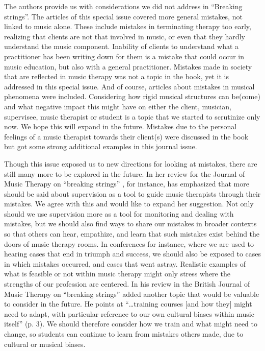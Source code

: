 \documentclass[authordate, empirical, issue]{jote-new-article}
\begin{document}
The authors provide us with considerations we did not address in “Breaking strings”. The articles of this special issue covered more general mistakes, not linked to music alone. These include mistakes in terminating therapy too early, realizing that clients are not that involved in music, or even that they hardly understand the music component. Inability of clients to understand what a practitioner has been writing down for them is a mistake that could occur in music education, but also with a general practitioner. Mistakes made in society that are reflected in music therapy was not a topic in the book, yet it is addressed in this special issue. And of course, articles about mistakes in musical phenomena were included. Considering how rigid musical structures can be(come) and what negative impact this might have on either the client, musician, supervisee, music therapist or student is a topic that we started to scrutinize only now. We hope this will expand in the future. Mistakes due to the personal feelings of a music therapist towards their client(s) were discussed in the book but got some strong additional examples in this journal issue.



Though this issue exposed us to new directions for looking at mistakes, there are still many more to be explored in the future. In her review for the Journal of Music Therapy on “breaking strings” \textcite{Wheeler2023}, for instance, has emphasized that more should be said about supervision as a tool to guide music therapists through their mistakes. We agree with this and would like to expand her suggestion. Not only should we use supervision more as a tool for monitoring and dealing with mistakes, but we should also find ways to share our mistakes in broader contexts so that others can hear, empathize, and learn that such mistakes exist behind the doors of music therapy rooms. In conferences for instance, where we are used to hearing cases that end in triumph and success, we should also be exposed to cases in which mistakes occurred, and cases that went astray. Realistic examples of what is feasible or not within music therapy might only stress where the strengths of our profession are centered. In his review in the British Journal of Music Therapy on “breaking strings” \textcite{Nye2023} added another topic that would be valuable to consider in the future. He points at “…training courses [and how they] might need to adapt, with particular reference to our own cultural biases within music itself” (p. 3). We should therefore consider how we train and what might need to change, so students can continue to learn from mistakes others made, due to cultural or musical biases.
\end{document}
